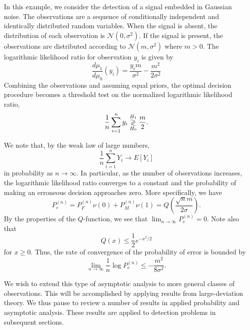 In this example, we consider the detection of a signal embedded in Gaussian noise.
The observations are a sequence of conditionally independent and identically distributed random variables.
When the signal is absent, the distribution of each observation is $\mathcal{N}(0,\sigma^2)$.
If the signal is present, the observations are distributed according to $\mathcal{N}(m,\sigma^2)$ where $m > 0$.
The logarithmic likelihood ratio for observation $y_i$ is given by
\begin{equation*}
\frac{d\mu_1}{d\mu_0} (y_i) = \frac{y_i m}{\sigma^2} - \frac{m^2}{2 \sigma^2}
\end{equation*}
Combining the observations and assuming equal priors, the optimal decision procedure becomes a threshold test on the normalized logarithmic likelihood ratio,
\begin{equation*}
\frac{1}{n} \sum_{i=1}^n y_i \overset{H_1}{ \underset{H_0}{\gtrless} } \frac{m}{2} .
\end{equation*}

We note that, by the weak law of large numbers,
\begin{equation*}
\frac{1}{n} \sum_{i=1}^n Y_i \rightarrow E[Y_i]
\end{equation*}
in probability as $n \rightarrow \infty$.
In particular, as the number of observations increases, the logarithmic likelihood ratio converges to a constant and the probability of making an erroneous decision approaches zero.
More specifically, we have
\begin{equation*}
P_e^{(n)} = P_F^{(n)} \nu(0) + P_M^{(n)} \nu(1)
= Q \left( \frac{\sqrt{n} m}{2 \sigma} \right) .
\end{equation*}
By the properties of the $Q$-function, we see that $\lim_{n \rightarrow \infty} P_e^{(n)} = 0$.
Note also that
\begin{equation*}
Q(x) \leq  \frac{1}{2} e^{-x^2/2}
\end{equation*}
for $x \geq 0$.
Thus, the rate of convergence of the probability of error is bounded by
\begin{equation*}
\lim_{n \rightarrow \infty} \frac{1}{n} \log P_e^{(n)}
\leq - \frac{m^2}{8 \sigma^2} .
\end{equation*}

We wish to extend this type of asymptotic analysis to more general classes of observations.
This will be accomplished by applying results from large-deviation theory.
We thus pause to review a number of results in applied probability and asymptotic analysis.
These results are applied to detection problems in subsequent sections.


